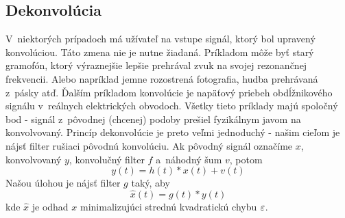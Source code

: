 \subsection{Dekonvolúcia}

V~niektorých prípadoch má užívateľ na vstupe signál, ktorý bol
upravený konvolúciou. Táto zmena nie je nutne žiadaná. Príkladom môže
byť starý gramofón, ktorý výraznejšie lepšie prehrával zvuk na
svojej rezonančnej frekvencii. Alebo napríklad jemne rozostrená
fotografia, hudba prehrávaná z~pásky atď.
Ďalším príkladom konvolúcie
je napäťový priebeh obdĺžnikového signálu v~reálnych elektrických
obvodoch. Všetky tieto príklady majú spoločný bod - signál z~pôvodnej
(chcenej) podoby prešiel fyzikálnym javom na konvolvovaný. Princíp
dekonvolúcie je preto veľmi jednoduchý - našim cieľom je nájsť filter
rušiaci pôvodnú konvolúciu.
Ak pôvodný signál označíme $x$, konvolvovaný $y$, konvolučný
filter $f$ a~náhodný šum $v$, potom
\begin{equation*}
    y(t) = h(t)*x(t) + v(t)
\end{equation*}
Našou úlohou je nájsť filter $g$ taký, aby
\begin{equation*}
  \hat{x}(t) = g(t)*y(t)
\end{equation*}
kde $\hat{x}$ je odhad $x$ minimalizujúci strednú kvadratickú chybu
$\varepsilon$.

